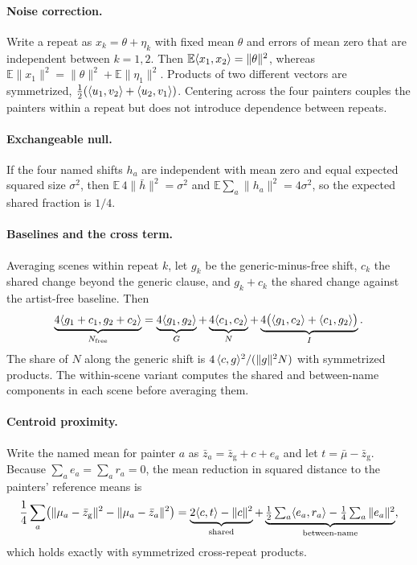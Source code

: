 \paragraph{Noise correction.} Write a repeat as $x_k=\theta+\eta_k$ with fixed mean $\theta$
and errors of mean zero that are independent between $k=1,2$. Then
$\mathbb E\langle x_1,x_2\rangle=\|\theta\|^2$, whereas $\mathbb E\|x_1\|^2=\|\theta\|^2+\mathbb
E\|\eta_1\|^2$. Products of two different vectors are symmetrized,
$\frac12(\langle u_1,v_2\rangle+\langle u_2,v_1\rangle)$. Centering across the four painters couples the painters
within a repeat but does not introduce dependence between repeats.

\paragraph{Exchangeable null.} If the four named shifts $h_a$ are independent with mean zero and
equal expected squared size $\sigma^2$, then $\mathbb E\,4\|\bar h\|^2=\sigma^2$ and $\mathbb
E\sum_a\|h_a\|^2=4\sigma^2$, so the expected shared fraction is $1/4$.

\paragraph{Baselines and the cross term.} Averaging scenes within repeat $k$, let $g_k$ be the
generic-minus-free shift, $c_k$ the shared change beyond the generic clause, and $g_k+c_k$ the
shared change against the artist-free baseline. Then
\begin{equation}
\underbrace{4\langle g_1+c_1,g_2+c_2\rangle}_{N_{\mathrm{free}}}=\underbrace{4\langle g_1,g_2\rangle}_{G}
+\underbrace{4\langle c_1,c_2\rangle}_{N}
+\underbrace{4\bigl(\langle g_1,c_2\rangle+\langle c_1,g_2\rangle\bigr)}_{I}.
\end{equation}
The share of $N$ along the generic shift is $4\,\langle c,g\rangle^2/(\|g\|^2N)$ with symmetrized
products. The within-scene variant computes the shared and between-name components in each
scene before averaging them.

\paragraph{Centroid proximity.} Write the named mean for painter $a$ as $\bar z_a=\bar
z_{\mathrm{g}}+c+e_a$ and let $t=\bar\mu-\bar z_{\mathrm{g}}$. Because $\sum_ae_a=\sum_ar_a=0$,
the mean reduction in squared distance to the painters' reference means is
\begin{equation}
\frac14\sum_a\bigl(\|\mu_a-\bar z_{\mathrm{g}}\|^2-\|\mu_a-\bar z_a\|^2\bigr)
=\underbrace{2\langle c,t\rangle-\|c\|^2}_{\text{shared}}
+\underbrace{\tfrac12\textstyle\sum_a\langle e_a,r_a\rangle-\tfrac14\sum_a\|e_a\|^2}_{\text{between-name}},
\end{equation}
which holds exactly with symmetrized cross-repeat products.

